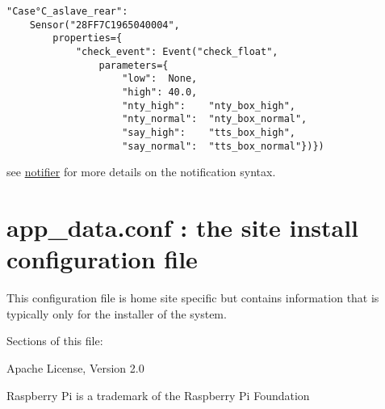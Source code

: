 \begin{verbatim}
"Case°C_aslave_rear":   
    Sensor("28FF7C1965040004",
        properties={
            "check_event": Event("check_float", 
                parameters={
                    "low":  None,
                    "high": 40.0,
                    "nty_high":    "nty_box_high",
                    "nty_normal":  "nty_box_normal",
                    "say_high":    "tts_box_high",
                    "say_normal":  "tts_box_normal"})})
\end{verbatim}

see \href{docs/notifier.md}{notifier} for more details on the
notification syntax.

\section{app\_data.conf : the site install configuration file}

This configuration file is home site specific but contains information
that is typically only for the installer of the system.

Sections of this file:


Apache License, Version 2.0

Raspberry Pi is a trademark of the Raspberry Pi Foundation



